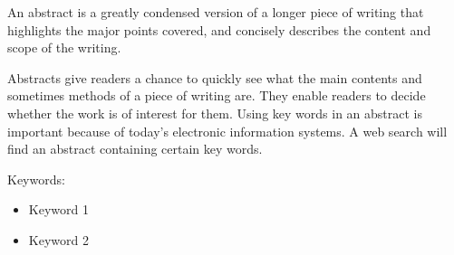 \label{cha:abtract} 

An abstract is a greatly condensed version of a longer piece of writing that highlights the major points covered, and concisely describes the content and scope of the writing. 

Abstracts give readers a chance to quickly see what the main contents and sometimes methods of a piece of writing are. They enable readers to decide whether the work is of interest for them. Using key words in an abstract is important because of today's electronic information systems. A web search will find an abstract containing certain key words.  

Keywords: 
\begin{itemize}
 \item Keyword 1
 \item Keyword 2
\end{itemize}
